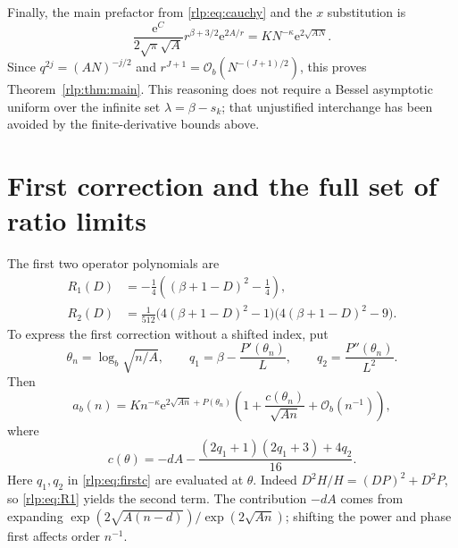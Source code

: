 \documentclass[11pt,letterpaper]{article}
\numberwithin{equation}{section}
\theoremstyle{remark}\newtheorem{remark}[theorem]{Remark}
\newcommand{\ee}{\mathrm e}
\newcommand{\Ord}{\mathcal O}
\begin{document}
Finally, the main prefactor from \eqref{rlp:eq:cauchy} and the $x$ substitution is
\[
 \frac{\ee^C}{2\sqrt\pi\sqrt A}r^{\beta+3/2}\ee^{2A/r}
 =K N^{-\kappa}\ee^{2\sqrt{AN}}.
\]
Since $q^{2j}=(AN)^{-j/2}$ and $r^{J+1}=\Ord_b(N^{-(J+1)/2})$, this proves Theorem~\ref{rlp:thm:main}. This reasoning does not require a Bessel asymptotic uniform over the infinite set $\lambda=\beta-s_k$; that unjustified interchange has been avoided by the finite-derivative bounds above.

\section{First correction and the full set of ratio limits}
\label{rlp:sec:corrections}
The first two operator polynomials are
\begin{align}
 R_1(D)&=-\frac14\left((\beta+1-D)^2-\frac14\right),\label{rlp:eq:R1}\\
 R_2(D)&=\frac1{512}
 \bigl(4(\beta+1-D)^2-1\bigr)
 \bigl(4(\beta+1-D)^2-9\bigr).\label{rlp:eq:R2}
\end{align}
To express the first correction without a shifted index, put
\[
 \theta_n=\log_b\sqrt{n/A},\qquad
 q_1=\beta-\frac{P'(\theta_n)}L,\qquad
 q_2=\frac{P''(\theta_n)}{L^2}.
\]
Then
\begin{equation}\label{rlp:eq:firstunshifted}
 a_b(n)=K n^{-\kappa}\ee^{2\sqrt{An}+P(\theta_n)}
 \left(1+\frac{c(\theta_n)}{\sqrt{An}}+\Ord_b(n^{-1})\right),
\end{equation}
where
\begin{equation}\label{rlp:eq:firstc}
 c(\theta)=-dA-
 \frac{(2q_1+1)(2q_1+3)+4q_2}{16}.
\end{equation}
Here $q_1,q_2$ in \eqref{rlp:eq:firstc} are evaluated at $\theta$. Indeed
$D^2H/H=(DP)^2+D^2P$, so \eqref{rlp:eq:R1} yields the second term. The contribution $-dA$ comes from expanding
$\exp(2\sqrt{A(n-d)})/\exp(2\sqrt{An})$; shifting the power and phase first affects order $n^{-1}$.
\end{document}
